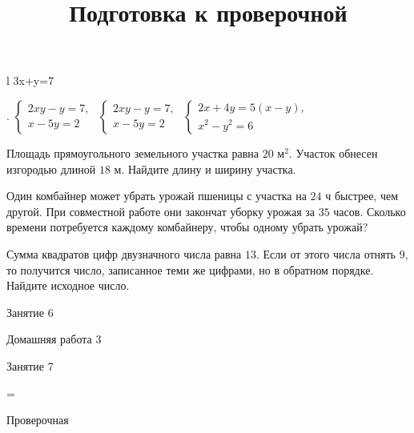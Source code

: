 \begin{class}[number=5]
\begin{listofex}
\begin{tasks}
\begin{array}{l}
				3x+y=7
			\end{array}
			\right.
			\)
			\task
			\(
			\left\{
			\begin{array}{l}
				2xy-y=7,\\
				x-5y=2
			\end{array}
			\right.
			\)
			\task
			\(
			\left\{
			\begin{array}{l}
				2xy-y=7,\\
				x-5y=2
			\end{array}
			\right.
			\)
			\task
			\(
			\left\{
			\begin{array}{l}
				2x+4y=5(x-y),\\
				x^2-y^2=6
			\end{array}
			\right.
			\)
		\end{tasks}
		\item Площадь прямоугольного земельного участка равна \( 20 \) м\(^2\). Участок обнесен изгородью длиной \( 18 \) м. Найдите длину и ширину участка.
		\item Один комбайнер может убрать урожай пшеницы с участка на \( 24 \) ч быстрее, чем другой.
		При совместной работе они закончат уборку урожая за \( 35 \) часов.
		Сколько времени потребуется каждому комбайнеру,
		чтобы одному убрать урожай?
		\item Сумма квадратов цифр двузначного числа равна \( 13 \).
		Если от этого числа отнять \( 9 \), то получится число, записанное теми же цифрами,
		но в обратном порядке. Найдите исходное число.
	\end{listofex}
\end{class}

\begin{class}[number=6]
	\begin{listofex}
		\item Занятие 6
	\end{listofex}
\end{class}

\begin{homework}[number=3]
	\begin{listofex}
		\item Домашняя работа 3
	\end{listofex}
\end{homework}

\begin{class}[number=7]
	\title{Подготовка к проверочной}
	\begin{listofex}
		\item Занятие 7
	\end{listofex}
\end{class}

=%
\begin{exam}
	\begin{listofex}
		\item Проверочная
	\end{listofex}
\end{exam}
